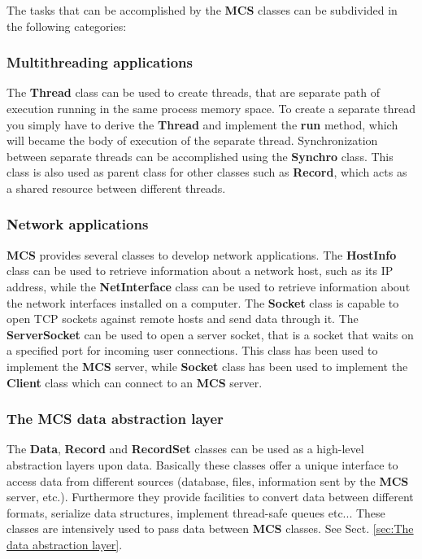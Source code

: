 \documentclass[12pt,titlepage]{article}
\newcommand{\mcs}{\textbf{MCS} }
\begin{document}
\bigskip
The tasks that can be accomplished by the \mcs classes can be subdivided
in the following categories:

\subsubsection{Multithreading applications}
The \textbf{Thread} class can be used to create threads, that are
separate path of execution running in the same process memory
space. To create a separate thread you simply have to derive the
\textbf{Thread} and implement the \textbf{run} method, which will
became the body of execution of the separate thread. Synchronization
between separate threads can be accomplished using the
\textbf{Synchro} class. This class is also used as parent class for
other classes such as \textbf{Record}, which acts as a shared resource
between different threads.

%
\subsubsection{Network applications}
\mcs provides several classes to develop network applications. The
\textbf{HostInfo} class can be used to retrieve information about a
network host, such as its IP address, while the \textbf{NetInterface}
class can be used to retrieve information about the network
interfaces installed on a computer. The \textbf{Socket} class is
capable to open TCP sockets against remote hosts and send data through
it. The \textbf{ServerSocket} can be used to open a server socket,
that is a socket that waits on a specified port for incoming user
connections. This class has been used to implement the \mcs server,
while \textbf{Socket} class has been used to implement the
\textbf{Client} class which can connect to an \mcs server.

%
\subsubsection{The \mcs data abstraction layer}
The \textbf{Data}, \textbf{Record} and \textbf{RecordSet} classes can
be used as a high-level abstraction layers upon data. Basically these
classes offer a unique interface to access data from different
sources (database, files, information sent by the \mcs server,
etc.). Furthermore they provide facilities to convert data between
different formats, serialize data structures, implement thread-safe
queues etc... These classes are intensively used to pass data between
\mcs classes. See Sect. \ref{sec:The data abstraction layer}.
\end{document}
